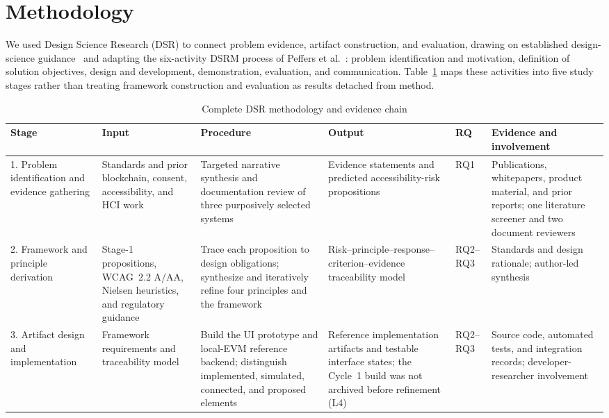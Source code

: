 \documentclass[journal]{IEEEtran}
\begin{document}
\section{Methodology}
\label{sec:methodology}

We used Design Science Research (DSR) to connect problem evidence, artifact construction, and evaluation, drawing on established design-science guidance~\cite{hevner2004design} and adapting the six-activity DSRM process of Peffers et al.~\cite{peffers2007dsrm}: problem identification and motivation, definition of solution objectives, design and development, demonstration, evaluation, and communication. Table~\ref{tab:dsr-method} maps these activities into five study stages rather than treating framework construction and evaluation as results detached from method.

\begin{table}[!htbp]
\centering
\small
\caption{Complete DSR methodology and evidence chain}
\label{tab:dsr-method}
\begin{tabularx}{\textwidth}{|p{2.2cm}|p{2.4cm}|X|p{2.4cm}|p{1.1cm}|p{2.2cm}|}
\hline
\textbf{Stage} & \textbf{Input} & \textbf{Procedure} & \textbf{Output} & \textbf{RQ} & \textbf{Evidence and involvement} \\
\hline
1. Problem identification and evidence gathering & Standards and prior blockchain, consent, accessibility, and HCI work & Targeted narrative synthesis and documentation review of three purposively selected systems & Evidence statements and predicted accessibility-risk propositions & RQ1 & Publications, whitepapers, product material, and prior reports; one literature screener and two document reviewers \\
\hline
2. Framework and principle derivation & Stage-1 propositions, WCAG~2.2 A/AA, Nielsen heuristics, and regulatory guidance & Trace each proposition to design obligations; synthesize and iteratively refine four principles and the framework & Risk--principle--response--criterion--evidence traceability model & RQ2--RQ3 & Standards and design rationale; author-led synthesis \\
\hline
3. Artifact design and implementation & Framework requirements and traceability model & Build the UI prototype and local-EVM reference backend; distinguish implemented, simulated, connected, and proposed elements & Reference implementation artifacts and testable interface states; the Cycle~1 build was not archived before refinement (L4) & RQ2--RQ3 & Source code, automated tests, and integration records; developer-researcher involvement \\

\end{tabularx}
\end{table}
\end{document}
